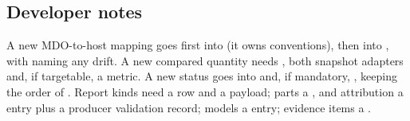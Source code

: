 \subsection{Developer notes}\label{sec:s14-dev}
A new MDO-to-host mapping goes first into  (it owns conventions), then into , with  naming any drift. A new compared quantity needs , both snapshot adapters and, if targetable, a metric. A new status goes into  and, if mandatory, , keeping the order of . Report kinds need a  row and a  payload; parts a , and attribution a  entry plus a producer validation record; models a  entry; evidence items a .
